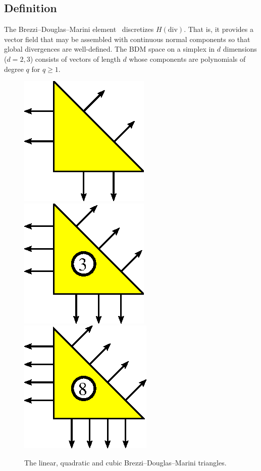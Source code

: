 \subsection{Definition}

The Brezzi--Douglas--Marini element~\cite{BrezziDouglasEtAl1985}
discretizes \( H(\mathrm{div}) \). That is, it provides a vector field
that may be assembled with continuous normal components so that global
divergences are well-defined.  The BDM space on a simplex in \( d \)
dimensions (\( d=2,3 \)) consists of vectors of length \( d \) whose
components are polynomials of degree \( q \) for
\( q \geq 1 \).

\begin{figure}[H]
  \begin{center}
    \includegraphics[width=\smallwidth]{chapters/kirby-6/eps/BDM1.eps}
    \includegraphics[width=\smallwidth]{chapters/kirby-6/eps/BDM2.eps}
    \includegraphics[width=\smallwidth]{chapters/kirby-6/eps/BDM3.eps}
    \caption{The linear, quadratic and cubic Brezzi--Douglas--Marini
      triangles.}
  \end{center}
\end{figure}

